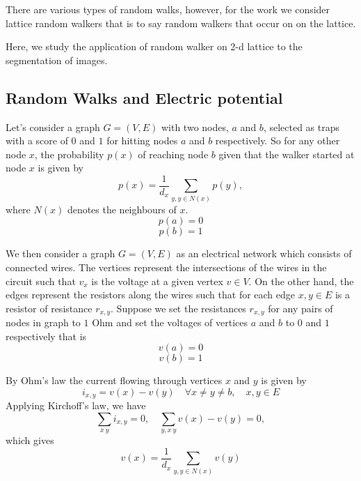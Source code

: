 \documentclass[10pt,a4paper]{article}
\begin{document}
There are various types of random walks, however, for the work we consider lattice random walkers that is to say random walkers that occur on on the lattice.

Here, we study the application of random walker on 2-d lattice to the segmentation of images. 
  
\subsection{Random Walks and Electric potential}
Let's consider a graph $G=(V,E)$ with two nodes, $a$ and $b$, selected as traps with a score of $0$ and $1$ for hitting nodes $a$ and $b$ respectively. So for any other node $x$, the probability $p(x)$ of reaching node $b$ given that the walker started at node $x$ is given by
\begin{equation}
p(x) = \frac{1}{d_x} \sum_{y, y \in N(x)} p(y),
\label{eqnp1}
\end{equation}
where $N(x)$ denotes the neighbours of $x$.
\begin{equation}
p(a) = 0
\label{eqnp2}
\end{equation}
\begin{equation}
p(b) = 1
\label{eqnp3}
\end{equation}

We then consider a graph $G=(V,E)$ as an electrical network which consists of connected wires. The vertices  represent the intersections of the wires in the circuit such that $v_x$ is the voltage at a given vertex $v \in V$. On the other hand, the edges represent the resistors along the wires such that for each edge $x,y \in E$ is a resistor of resistance $r_{x,y}$.
Suppose we set the resistances $r_{x,y}$ for any pairs of nodes in graph to $1$ Ohm and set the voltages of vertices $a$ and $b$ to $0$ and $1$ respectively that is 
\begin{equation}
v(a) = 0
\label{eqnv1}
\end{equation}
\begin{equation}
v(b) = 1
\label{eqnv2}
\end{equation}
 

By Ohm's law the current flowing through vertices $x$ and $y$ is given by
\begin{equation}
i_{x,y} = v(x) -v(y) \quad \forall x\neq y\neq b, \quad x,y \in E
\end{equation}
Applying Kirchoff's law, we have
\begin{equation}
\sum_{x~y} i_{x,y} =0 , \quad \sum_{y,x~y} v(x) -v(y)  =0,
\end{equation}
which gives
\begin{equation}
v(x) = \frac{1}{d_x} \sum_{y, y \in N(x)} v(y)
\label{eqnv3}
\end{equation}
\end{document}
